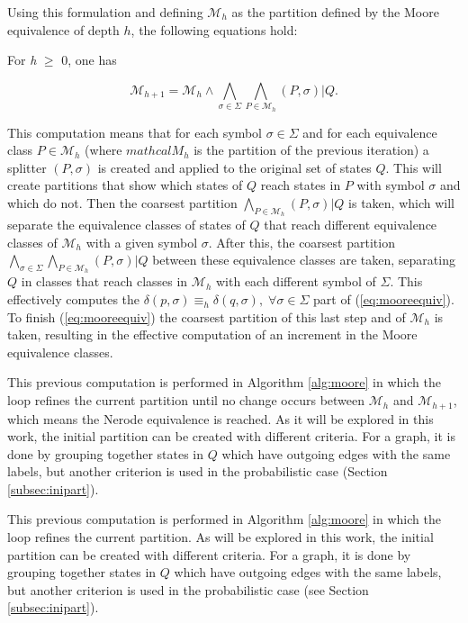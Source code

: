 {\noindent Using this formulation and defining $\mathcal{M}_h$ as the partition defined by the Moore equivalence of depth $h$, the following equations hold:

\begin{proposition}\label{prop:moorecomp}
For \textit{h} $\geq$ 0, one has

\end{proposition}

\begin{equation}\label{eq:mooreequiv}
\mathcal{M}_{h+1} = \mathcal{M}_h \wedge \bigwedge_{\sigma\in\Sigma} \bigwedge_{P\in\mathcal{M}_h}(P,\sigma)|Q.
\end{equation}

\noindent This computation means that for each symbol $\sigma\in\Sigma$ and for each equivalence class $P\in\mathcal{M}_h$ (where $mathcal{M}_h$ is the partition of the previous iteration) a splitter $(P,\sigma)$ is created and applied to the original set of states $Q$. This will create partitions that show which states of $Q$ reach states in $P$ with symbol $\sigma$ and which do not. Then the coarsest partition $\bigwedge_{P\in\mathcal{M}_h}(P,\sigma)|Q$ is taken, which will separate the equivalence classes of states of $Q$ that reach different equivalence classes of $\mathcal{M}_h$ with a given symbol $\sigma$. After this, the coarsest partition $\bigwedge_{\sigma\in\Sigma} \bigwedge_{P\in\mathcal{M}_h}(P,\sigma)|Q$ between these equivalence classes are taken, separating $Q$ in classes that reach classes in $\mathcal{M}_h$ with each different symbol of $\Sigma$. This effectively computes the $\delta(p,\sigma) \equiv_h \delta(q,\sigma), \; \forall \sigma \in \Sigma$ part of (\ref{eq:mooreequiv}). To finish (\ref{eq:mooreequiv}) the coarsest partition of this last step and of $\mathcal{M}_h$ is taken, resulting in the effective computation of an increment in the Moore equivalence classes.

 This previous computation is performed in Algorithm \ref{alg:moore} in which the loop refines the current partition until no change occurs between $\mathcal{M}_h$ and $\mathcal{M}_{h+1}$, which means the Nerode equivalence is reached. As it will be explored in this work, the initial partition can be created with different criteria. For a graph, it is done by grouping together states in $Q$ which have outgoing edges with the same labels, but another criterion is used in the probabilistic case (Section \ref{subsec:inipart}).

 This previous computation is performed in Algorithm \ref{alg:moore} in which the loop refines the current partition. As will be explored in this work, the initial partition can be created with different criteria. For a graph, it is done by grouping together states in $Q$ which have outgoing edges with the same labels, but another criterion is used in the probabilistic case (see Section \ref{subsec:inipart}).

}

